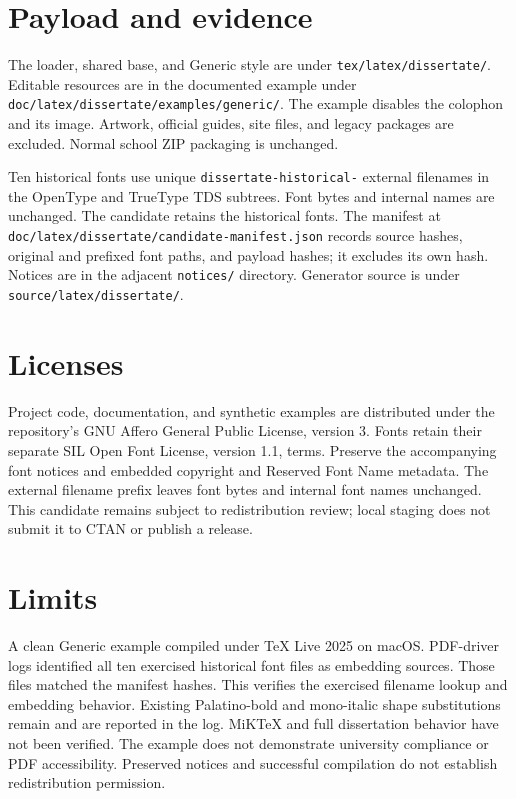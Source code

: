 \documentclass[10pt,letterpaper]{article}
\begin{document}
\section*{Payload and evidence}
The loader, shared base, and Generic style are under \texttt{tex/latex/dissertate/}. Editable resources are in the documented example under \texttt{doc/latex/dissertate/examples/generic/}. The example disables the colophon and its image. Artwork, official guides, site files, and legacy packages are excluded. Normal school ZIP packaging is unchanged.

Ten historical fonts use unique \texttt{dissertate-historical-} external filenames in the OpenType and TrueType TDS subtrees. Font bytes and internal names are unchanged. The candidate retains the historical fonts. The manifest at \texttt{doc/latex/dissertate/candidate-manifest.json} records source hashes, original and prefixed font paths, and payload hashes; it excludes its own hash. Notices are in the adjacent \texttt{notices/} directory. Generator source is under \texttt{source/latex/dissertate/}.
\section*{Licenses}
Project code, documentation, and synthetic examples are distributed under the repository's GNU Affero General Public License, version 3. Fonts retain their separate SIL Open Font License, version 1.1, terms. Preserve the accompanying font notices and embedded copyright and Reserved Font Name metadata. The external filename prefix leaves font bytes and internal font names unchanged. This candidate remains subject to redistribution review; local staging does not submit it to CTAN or publish a release.
\section*{Limits}
A clean Generic example compiled under TeX Live 2025 on macOS. PDF-driver logs identified all ten exercised historical font files as embedding sources. Those files matched the manifest hashes. This verifies the exercised filename lookup and embedding behavior. Existing Palatino-bold and mono-italic shape substitutions remain and are reported in the log. MiKTeX and full dissertation behavior have not been verified. The example does not demonstrate university compliance or PDF accessibility. Preserved notices and successful compilation do not establish redistribution permission.
\end{document}
